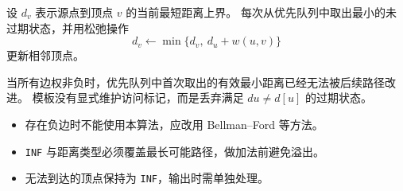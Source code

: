 设 $d_v$ 表示源点到顶点 $v$ 的当前最短距离上界。
每次从优先队列中取出最小的未过期状态，并用松弛操作
\[
  d_v \gets \min\{d_v,\ d_u+w(u,v)\}
\]
更新相邻顶点。

\begin{icpcresult}[正确性关键]
  当所有边权非负时，优先队列中首次取出的有效最小距离已经无法被后续路径改进。
  模板没有显式维护访问标记，而是丢弃满足 \(du\ne d[u]\) 的过期状态。
\end{icpcresult}

\begin{icpcwarning}[使用前确认]
  \begin{itemize}
    \item 存在负边时不能使用本算法，应改用 Bellman--Ford 等方法。
    \item \texttt{INF} 与距离类型必须覆盖最长可能路径，做加法前避免溢出。
    \item 无法到达的顶点保持为 \texttt{INF}，输出时需单独处理。
  \end{itemize}
\end{icpcwarning}
